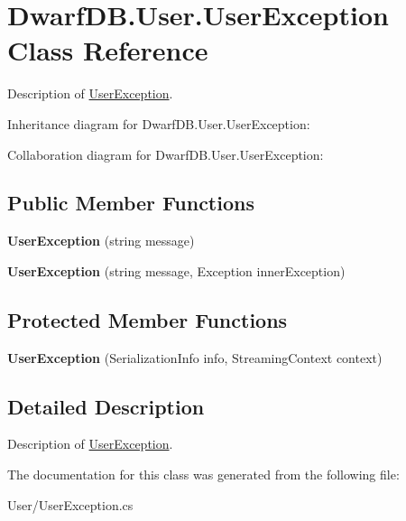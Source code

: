 \hypertarget{class_dwarf_d_b_1_1_user_1_1_user_exception}{\section{Dwarf\+D\+B.\+User.\+User\+Exception Class Reference}
\label{class_dwarf_d_b_1_1_user_1_1_user_exception}
}


Description of \hyperlink{class_dwarf_d_b_1_1_user_1_1_user_exception}{User\+Exception}.  




Inheritance diagram for Dwarf\+D\+B.\+User.\+User\+Exception\+:


Collaboration diagram for Dwarf\+D\+B.\+User.\+User\+Exception\+:
\subsection*{Public Member Functions}
\begin{DoxyCompactItemize}
\item 
\hypertarget{class_dwarf_d_b_1_1_user_1_1_user_exception_a1077457ad1927f13456743fa4829219b}{{\bfseries User\+Exception} (string message)}\label{class_dwarf_d_b_1_1_user_1_1_user_exception_a1077457ad1927f13456743fa4829219b}

\item 
\hypertarget{class_dwarf_d_b_1_1_user_1_1_user_exception_a4a3f2b2e90fa58f746465beda25bd0f8}{{\bfseries User\+Exception} (string message, Exception inner\+Exception)}\label{class_dwarf_d_b_1_1_user_1_1_user_exception_a4a3f2b2e90fa58f746465beda25bd0f8}

\end{DoxyCompactItemize}
\subsection*{Protected Member Functions}
\begin{DoxyCompactItemize}
\item 
\hypertarget{class_dwarf_d_b_1_1_user_1_1_user_exception_aadcc97ae25a3c4db279d96e721e9ef2a}{{\bfseries User\+Exception} (Serialization\+Info info, Streaming\+Context context)}\label{class_dwarf_d_b_1_1_user_1_1_user_exception_aadcc97ae25a3c4db279d96e721e9ef2a}

\end{DoxyCompactItemize}


\subsection{Detailed Description}
Description of \hyperlink{class_dwarf_d_b_1_1_user_1_1_user_exception}{User\+Exception}. 



The documentation for this class was generated from the following file\+:\begin{DoxyCompactItemize}
\item 
User/User\+Exception.\+cs\end{DoxyCompactItemize}
